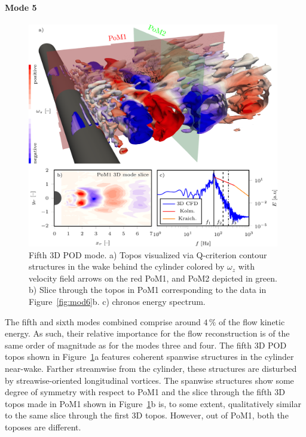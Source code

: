 {{\paragraph{Mode 5}
\begin{figure}[htbp]
    \centering
    \includegraphics[width=0.98\textwidth]{02_images/00_export/figure21.png}
    \caption{{Fifth 3D POD mode. a)} Topos {visualized via} Q-criterion contour structures in the wake behind the cylinder colored by $\omega_z$ with velocity field arrows on the red PoM1, and PoM2 depicted in green. {b) Slice through the topos in PoM1 corresponding to the data in Figure~\ref{fig:mod6}b. c) chronos energy spectrum.}}
    \label{fig:3Dmod6}
\end{figure}
{The fifth and sixth modes combined comprise around $4\,\%$ of the flow kinetic energy. As such, their relative importance for the flow reconstruction is of the same order of magnitude as for the modes three and four. The fifth 3D POD topos shown in Figure~\ref{fig:3Dmod6}a features coherent spanwise structures in the cylinder near-wake. Farther streamwise from the cylinder, these structures are disturbed by streawise-oriented longitudinal vortices. The spanwise structures show some degree of symmetry with respect to PoM1 and the slice through the fifth 3D topos made in PoM1 shown in Figure~\ref{fig:3Dmod6}b is, to some extent, qualitatively similar to the same slice through the first 3D topos. However, out of PoM1, both the toposes are different.}

}}
